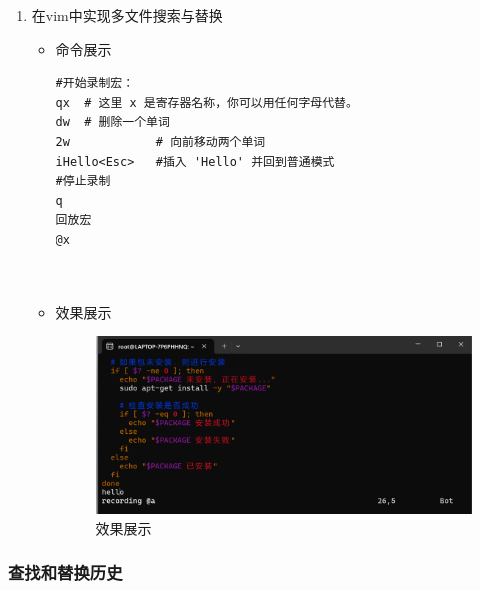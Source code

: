 \documentclass[UTF8]{ctexart}
\begin{document}
\begin{enumerate}
  \item 在vim中实现多文件搜索与替换
  \begin{itemize}
  \item 命令展示
  \begin{verbatim}
#开始录制宏：
qx  # 这里 x 是寄存器名称，你可以用任何字母代替。
dw  # 删除一个单词
2w            # 向前移动两个单词
iHello<Esc>   #插入 'Hello' 并回到普通模式
#停止录制
q
回放宏
@x

    
  \end{verbatim}

  \item 效果展示
  \begin{figure}[H]
    \centering
    \includegraphics[width=\textwidth]{23} %
    \caption{效果展示}
  
  \end{figure}
\end{itemize}
\end{enumerate}

\subsubsection{查找和替换历史}
\end{document}
